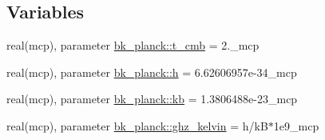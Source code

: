 \subsection*{Variables}
\begin{DoxyCompactItemize}
\item 
real(mcp), parameter \mbox{\hyperlink{namespacebk__planck_aed63f60182fa590d070ff874aff39d1e}{bk\+\_\+planck\+::t\+\_\+cmb}} = 2.\+\_\+mcp
\item 
real(mcp), parameter \mbox{\hyperlink{namespacebk__planck_a2be53d116cb947e12107471bd0b14abd}{bk\+\_\+planck\+::h}} = 6.\+62606957e-\/34\+\_\+mcp
\item 
real(mcp), parameter \mbox{\hyperlink{namespacebk__planck_a92bf968defaa02497d39c2f228710c04}{bk\+\_\+planck\+::kb}} = 1.\+3806488e-\/23\+\_\+mcp
\item 
real(mcp), parameter \mbox{\hyperlink{namespacebk__planck_a3b81f62eff019d7f94b2a4ca37efdf91}{bk\+\_\+planck\+::ghz\+\_\+kelvin}} = h/kB$\ast$1e9\+\_\+mcp
\end{DoxyCompactItemize}

